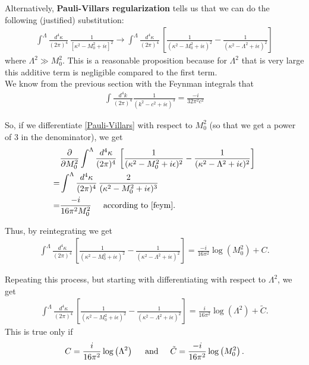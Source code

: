 \documentclass{book}
\theoremstyle{definition}
\newcommand{\p}{\partial}
\newcommand{\f}[2]{\frac{#1}{#2}}
\newcommand{\lp}{\left(}
\newcommand{\rp}{\right)}
\newcommand{\lb}{\left[}
\newcommand{\rb}{\right]}
\begin{document}
Alternatively, \textbf{Pauli-Villars regularization} tells us that we can do the following (justified) substitution:
\begin{align}\label{Pauli-Villars}
\boxed{\int^\Lambda \f{d^4\kappa}{(2\pi)^4}  \, \f{1}{[\kappa^2 - M_0^2 + i\epsilon ]^2} \to \int^\Lambda \f{d^4\kappa}{(2\pi)^4}  \, \lb\f{1}{(\kappa^2 - M_0^2 + i\epsilon )^2} - \f{1}{(\kappa^2 - \Lambda^2 + i\epsilon)^2}\rb}
\end{align}
where $\Lambda^2 \gg M_0^2$. This is a reasonable proposition because for $\Lambda^2$ that is very large this additive term is negligible compared to the first term. \\



We know from the previous section with the Feynman integrals that
\begin{align}\label{feym}
{\int \f{d^4k}{(2\pi)^4} \f{1}{(k^2 - c^2+ i\epsilon)^3} = \f{-i}{32\pi^2 c^2}}
\end{align}


So, if we differentiate \eqref{Pauli-Villars} with respect to $M_0^2$ (so that we get a power of 3 in the denominator), we get
\begin{align}
&\f{\p}{\p M_0^2} \int^\Lambda \f{d^4\kappa}{(2\pi)^4}   \, \lb\f{1}{(\kappa^2 - M_0^2 + i\epsilon )^2} - \f{1}{(\kappa^2 - \Lambda^2 + i\epsilon)^2}\rb \nonumber\\
= &\int^\Lambda \f{d^4\kappa}{(2\pi)^4}   \, \f{2}{(\kappa^2 - M_0^2 + i\epsilon )^3} \nonumber\\
= &\f{-i}{16\pi^2 M_0^2} \hspace{0.5cm} \text{according to \eqref{feym}}. 
\end{align}

Thus, by reintegrating we get
\begin{align}
\int^\Lambda \f{d^4\kappa}{(2\pi)^4}   \, \lb\f{1}{(\kappa^2 - M_0^2 + i\epsilon )^2} - \f{1}{(\kappa^2 - \Lambda^2 + i\epsilon)^2}\rb = \f{-i}{16\pi^2}\log\lp M_0^2\rp + C.
\end{align}

Repeating this process, but starting with differentiating with respect to $\Lambda^2$, we get
\begin{align}
\int^\Lambda \f{d^4\kappa}{(2\pi)^4}   \, \lb\f{1}{(\kappa^2 - M_0^2 + i\epsilon )^2} - \f{1}{(\kappa^2 - \Lambda^2 + i\epsilon)^2}\rb = \f{i}{16\pi^2}\log\lp \Lambda^2\rp + \tilde{C}.
\end{align}
This is true only if
\begin{align}
C = \f{i}{16\pi^2}\log\lp \Lambda^2\rp \hspace{0.5cm}\text{and}\hspace{0.5cm} \tilde{C} = \f{-i}{16\pi^2}\log\lp M_0^2\rp.
\end{align}
\end{document}
